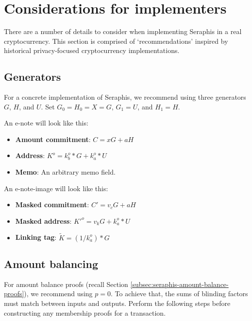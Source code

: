 \section{Considerations for implementers}
\label{sec:considerations-implementers}

There are a number of details to consider when implementing Seraphis in a real cryptocurrency. This section is comprised of `recommendations' inspired by historical privacy-focused cryptocurrency implementations.


\subsection{Generators}
\label{subsec:implementers-generators}

For a concrete implementation of Seraphis, we recommend using three generators $G$, $H$, and $U$. Set $G_0 = H_0 = X = G$, $G_1 = U$, and $H_1 = H$.

An e-note will look like this:

\begin{itemize}
    \item \textbf{Amount commitment}: $C = x G + a H$
    \item \textbf{Address}: $K^o = k^o_b*G + k^o_a*U$
    \item \textbf{Memo}: An arbitrary memo field.
\end{itemize}

An e-note-image will look like this:

\begin{itemize}
    \item \textbf{Masked commitment}: $C' = v_c G + a H$
    \item \textbf{Masked address}: $K'^o = v_k G + k^o_a*U$
    \item \textbf{Linking tag}: $\tilde{K} = (1/k^o_a)*G$
\end{itemize}


\subsection{Amount balancing}
\label{subsec:implementers-amount-balancing}

For amount balance proofs (recall Section \ref{subsec:seraphis-amount-balance-proofs}), we recommend using $p = 0$. To achieve that, the sums of blinding factors must match between inputs and outputs. Perform the following steps before constructing any membership proofs for a transaction.

